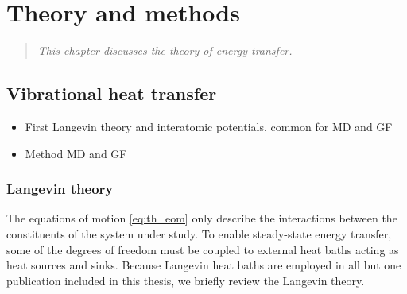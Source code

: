\chapter{Theory and methods}

\begin{quote}
 \textit{This chapter discusses the theory of energy transfer.}
\end{quote}


\section{Vibrational heat transfer}

\begin{itemize}
 \item First Langevin theory and interatomic potentials, common for MD and GF
 \item Method MD and GF
\end{itemize}






\subsection{Langevin theory} 
\label{sec:th_langevin}
The equations of motion \eqref{eq:th_eom} only describe the interactions between the constituents of the system under study. To enable steady-state energy transfer, some of the degrees of freedom must be coupled to external heat baths acting as heat sources and sinks. Because Langevin heat baths are employed in all but one publication included in this thesis, we briefly review the Langevin theory.


